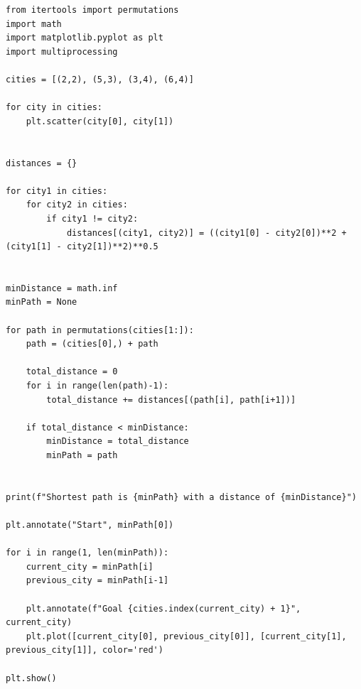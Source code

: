\documentclass{article}
\begin{document}
\begin{verbatim}
from itertools import permutations
import math
import matplotlib.pyplot as plt
import multiprocessing

cities = [(2,2), (5,3), (3,4), (6,4)]

for city in cities:
    plt.scatter(city[0], city[1])


distances = {}

for city1 in cities:
    for city2 in cities:
        if city1 != city2:
            distances[(city1, city2)] = ((city1[0] - city2[0])**2 + (city1[1] - city2[1])**2)**0.5


minDistance = math.inf
minPath = None

for path in permutations(cities[1:]):
    path = (cities[0],) + path
    
    total_distance = 0
    for i in range(len(path)-1):
        total_distance += distances[(path[i], path[i+1])]
    
    if total_distance < minDistance:
        minDistance = total_distance
        minPath = path


print(f"Shortest path is {minPath} with a distance of {minDistance}")

plt.annotate("Start", minPath[0])

for i in range(1, len(minPath)):
    current_city = minPath[i]
    previous_city = minPath[i-1]

    plt.annotate(f"Goal {cities.index(current_city) + 1}", current_city)
    plt.plot([current_city[0], previous_city[0]], [current_city[1], previous_city[1]], color='red')

plt.show()
\end{verbatim}
\end{document}
